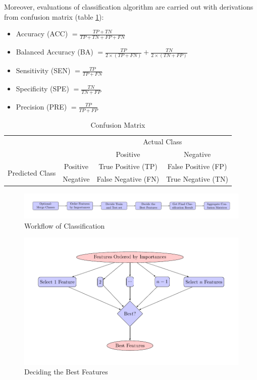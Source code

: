 \documentclass[a4paper]{article}
\begin{document}
            Moreover, evaluations of classification algorithm are carried out with derivations from confusion matrix (table \ref{tb:confusion-matrix}):

            \begin{itemize}
                \item Accuracy (ACC) $ = \frac{TP + TN}{TP + TN + FP + FN}$
                \item Balanced Accuracy (BA) $ = \frac{TP}{2 \times (TP + FN)} + \frac{TN}{2 \times (TN + FP)}$
                \item Sensitivity (SEN) $ = \frac{TP}{TP + FN}$
                \item Specificity (SPE) $ = \frac{TN}{TN + FP}$
                \item Precision (PRE) $ = \frac{TP}{TP + FP}$
            \end{itemize}

            \begin{table}[p]
                \centering
                \caption{Confusion Matrix}
                \label{tb:confusion-matrix}
                \begin{tabular}{c|c|cc}
                    \multicolumn{2}{c|}{\multirow{2}{*}{}} & \multicolumn{2}{c}{Actual Class} \\ \cline{3-4}
                    \multicolumn{2}{c|}{} & Positive & Negative \\ \hline
                    \multirow{2}{*}{Predicted Class} & Positive & True Positive (TP) & False Positive (FP) \\
                    & Negative & False Negative (FN) & True Negative (TN)
                \end{tabular}
            \end{table}

            \begin{figure}[p]
                \centering
                \includegraphics[width=0.8 \linewidth]{figures/Classifier/classifier.pdf}
                \caption{Workflow of Classification}
                \label{fig:classification}
            \end{figure}

            \begin{figure}[p]
                \centering
                \includegraphics[width=0.6 \linewidth]{figures/Classifier/best.pdf}
                \caption{Deciding the Best Features}
                \label{fig:deciding-best}
            \end{figure}
\end{document}
